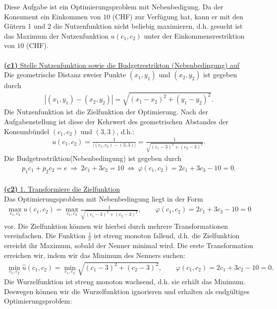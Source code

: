 Diese Aufgabe ist ein Optimierungsproblem mit Nebenbedigung.
Da der Konsument ein Einkommen von $10$ (CHF) zur Verfügung hat, kann er mit den Gütern 1 und 2  die Nutzenfunktion nicht beliebig maximieren, d.h. gesucht ist das Maximum der Nutzenfunktion $u(c_1,c_2)$ unter der Einkommensrestriktion von $10$ (CHF).\\
\\
\underline{\textbf{(c1)} Stelle Nutzenfunktion sowie die Budgetrestrikton (Nebenbedingung) auf}\\
Die geometrische Distanz zweier Punkte $(x_1,y_1)$ und $(x_2,y_2)$ ist gegeben durch
\begin{align*}
	\left|(x_1,y_1) - (x_2,y_2) \right|
	=
	\sqrt{(x_1 -x_2)^2 + (y_1-y_2)^2}. 
\end{align*}
Die Nutzenfunktion ist die Zielfunktion der Optimierung. Nach der Aufgabenstellung ist diese der Kehrwert des geometrischen Abstandes der Konsumbündel $(c_1,c_2)$ und $(3,3)$, d.h.:
\begin{align*}
	u(c_1,c_2)
	=
	\frac{1}{\left|(c_1,c_2) - (3,3) \right|}
	=
	\frac{1}{\sqrt{(c_1 -3)^2 + (c_2-3)^2}}.
\end{align*}
Die Budgetrestriktion(Nebenbedingung) ist gegeben durch
\begin{align*}
	p_1 c_1 + p_2 c_2= e 
	\ \Rightarrow \
	2 c_1 + 3 c_2 = 10
	\ \Leftrightarrow \
	\varphi(c_1,c_2) = 2 c_1 + 3c_3 - 10= 0.
\end{align*} 
\  \\
\underline{\textbf{(c2)} 1. Transformiere die Zielfunktion}\\
Das Optimierungsproblem mit Nebenbedingung liegt in der Form 
\begin{align*}
	\max \limits_{c_1,c_2} u(c_1,c_2)
	=
	\max \limits_{c_1,c_2} \frac{1}{\sqrt{(c_1 -3)^2 + (c_2-3)^2}}
	, \qquad \varphi(c_1,c_2) = 2 c_1 + 3c_3 - 10= 0
\end{align*}
vor. Die Zielfunktion können wir hierbei durch mehrere Transformationen vereinfachen. Die Funktion $\frac{1}{x}$ ist streng monoton fallend, d.h. die Zielfunktion erreicht ihr Maximum, sobald der Nenner minimal wird. Die erste Transformation erreichen wir, indem wir das Minimum des Nenners suchen:
\begin{align*}
	\min \limits_{c_1,c_2}
	\hat{u}(c_1,c_2)
	=
	\min \limits_{c_1,c_2} \sqrt{(c_1 -3)^2 + (c_2-3)^2}
	, \qquad \varphi(c_1,c_2) = 2 c_1 + 3c_2 - 10= 0.
\end{align*}
Die Wurzelfunktion ist streng monoton wachsend, d.h. sie erhält das Minimum. Deswegen können wir die Wurzelfunktion ignorieren und erhalten als endgültiges Optimierungsproblem:
